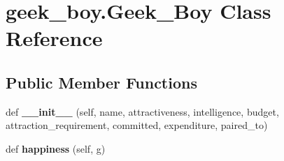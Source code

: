 \hypertarget{classgeek__boy_1_1_geek___boy}{}\section{geek\+\_\+boy.\+Geek\+\_\+\+Boy Class Reference}
\label{classgeek__boy_1_1_geek___boy}
\subsection*{Public Member Functions}
\begin{DoxyCompactItemize}
\item 
\mbox{\label{classgeek__boy_1_1_geek___boy_ae4df402c3dda6877a3957e4bdd41b228}} 
def {\bfseries \+\_\+\+\_\+init\+\_\+\+\_\+} (self, name, attractiveness, intelligence, budget, attraction\+\_\+requirement, committed, expenditure, paired\+\_\+to)
\item 
\mbox{\label{classgeek__boy_1_1_geek___boy_a651f4b0e255c1585737ffd0a93099edd}} 
def {\bfseries happiness} (self, g)
\end{DoxyCompactItemize}
